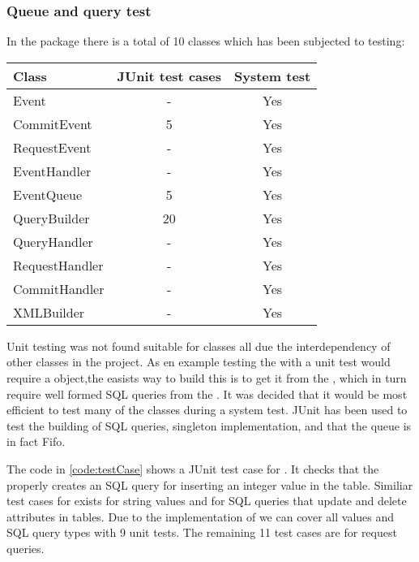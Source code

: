 \subsubsection{Queue and query test}
In the  package there is a total of 10 classes which has been subjected to testing: 

\begin{table}[H]
  \begin{center}
  \begin{tabular}{l|c|c}
    Class          & JUnit test cases & System test\\
\hline
    Event          & -                &Yes\\
    CommitEvent    & 5                &Yes\\
    RequestEvent   & -                &Yes\\
    EventHandler   & -                &Yes\\
    EventQueue     & 5                &Yes\\
    QueryBuilder   & 20               &Yes\\
    QueryHandler   & -                &Yes\\
    RequestHandler & -                &Yes\\
    CommitHandler  & -                &Yes\\
    XMLBuilder     & -                &Yes\\
  \end{tabular}
  \end{center}
\end{table}

Unit testing was not found suitable for classes all due the interdependency of other classes in the project. As en example testing the  with a unit test would require
a  object,the easists way to build this is to get it from the , which in turn require well formed SQL queries from the .
It was decided that it would be most efficient to test many of the classes during a system test. JUnit has been used to test the building of SQL queries, singleton implementation,
and that the queue is in fact Fifo. 

The code in \autoref{code:testCase} shows a JUnit test case for . It checks that the  properly creates an SQL query for inserting an integer value
in the  table. Similiar test cases for exists for string values and for SQL queries that update and delete attributes in tables.
Due to the implementation of  we can cover all values and SQL query types with 9 unit tests. The remaining 11 test cases are for request queries.

